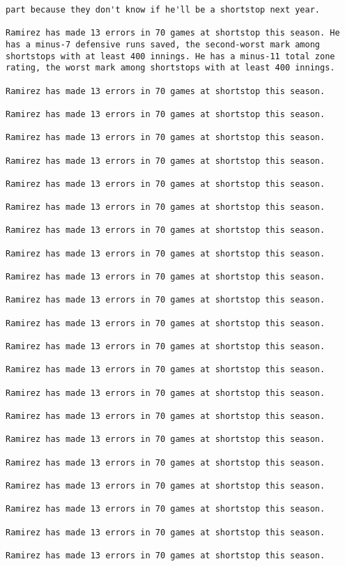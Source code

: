 \begin{lstlisting}
part because they don't know if he'll be a shortstop next year.

Ramirez has made 13 errors in 70 games at shortstop this season. He has a minus-7 defensive runs saved, the second-worst mark among shortstops with at least 400 innings. He has a minus-11 total zone rating, the worst mark among shortstops with at least 400 innings.

Ramirez has made 13 errors in 70 games at shortstop this season.

Ramirez has made 13 errors in 70 games at shortstop this season.

Ramirez has made 13 errors in 70 games at shortstop this season.

Ramirez has made 13 errors in 70 games at shortstop this season.

Ramirez has made 13 errors in 70 games at shortstop this season.

Ramirez has made 13 errors in 70 games at shortstop this season.

Ramirez has made 13 errors in 70 games at shortstop this season.

Ramirez has made 13 errors in 70 games at shortstop this season.

Ramirez has made 13 errors in 70 games at shortstop this season.

Ramirez has made 13 errors in 70 games at shortstop this season.

Ramirez has made 13 errors in 70 games at shortstop this season.

Ramirez has made 13 errors in 70 games at shortstop this season.

Ramirez has made 13 errors in 70 games at shortstop this season.

Ramirez has made 13 errors in 70 games at shortstop this season.

Ramirez has made 13 errors in 70 games at shortstop this season.

Ramirez has made 13 errors in 70 games at shortstop this season.

Ramirez has made 13 errors in 70 games at shortstop this season.

Ramirez has made 13 errors in 70 games at shortstop this season.

Ramirez has made 13 errors in 70 games at shortstop this season.

Ramirez has made 13 errors in 70 games at shortstop this season.

Ramirez has made 13 errors in 70 games at shortstop this season.


\end{lstlisting}
